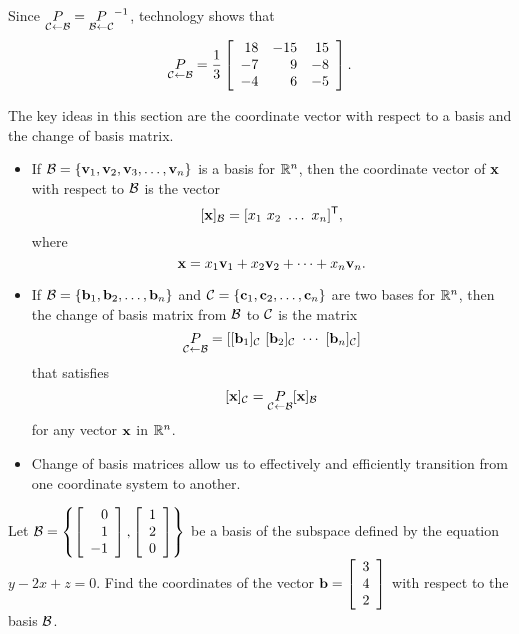 \begin{example}
	\item Since $\underset{\mathcal{C} \leftarrow \mathcal{B}}{P} = \underset{\mathcal{B} \leftarrow \mathcal{C}}{P}^{-1}$, technology shows that 
	\[\underset{\mathcal{C} \leftarrow \mathcal{B}}{P} = \frac{1}{3} \left[ \begin{array}{rrr} 18&-15&15\\-7&9&-8\\-4&6&-5 \end{array} \right].\]
	

	\ea
	
\end{example}


\label{sec:cob_summ}

The key ideas in this section are the coordinate vector with respect to a basis and the change of basis matrix.

\begin{itemize}
\item If $\mathcal{B} = \{\mathbf{v}_1, \mathbf{v}_2, \mathbf{v}_3, \ldots, \mathbf{v}_n\}$ is a basis for $\mathbb{R}^n$, then the coordinate vector of $\mathbf{x}$ with respect to $\mathcal{B}$ is the vector
\[[\vx]_{\CB} = [x_1 \ x_2 \ \ldots \ x_n]^{\tr},\]
where
\[\mathbf{x} = x_1 \mathbf{v}_1 + x_2 \mathbf{v}_2 + \cdots + x_n \mathbf{v}_n.\]
\item If $\mathcal{B} = \{\mathbf{b}_1, \mathbf{b}_2, \ldots, \mathbf{b}_n\}$ and $\mathcal{C} = \{\mathbf{c}_1, \mathbf{c}_2, \ldots, \mathbf{c}_n\}$ are two bases for $\mathbb{R}^n$, then the change of basis matrix from $\mathcal{B}$ to $\mathcal{C}$ is the matrix
\[\underset{\mathcal{C} \leftarrow \mathcal{B}}{P} = [[\mathbf{b}_1]_{\mathcal{C}} \ [\mathbf{b}_2]_{\mathcal{C}}  \  \cdots  \ [\mathbf{b}_n]_{\mathcal{C}}]\]
that satisfies 
\[[\mathbf{x}]_{\mathcal{C}} = \underset{\mathcal{C} \leftarrow \mathcal{B}}{P}[\mathbf{x}]_{\mathcal{B}}\]
for any vector $\mathbf{x}$ in $\mathbb{R}^n$.
\item Change of basis matrices allow us to effectively and efficiently transition from one coordinate system to another. 
\end{itemize}


\label{sec:cob_exer}

\be
\item Let $\mathcal{B}=\left\{ \left[ \begin{array}{r} 0\\1\\-1 \end{array} \right], \left[ \begin{array}{c} 1\\2\\0 \end{array} \right] \right\}$ be a basis of the subspace defined by the equation $y-2x+z=0$.
Find the coordinates of the vector $\mathbf{b}=\left[ \begin{array}{c} 3\\4\\2 \end{array} \right]$ with respect to the basis $\mathcal{B}$. 
 
